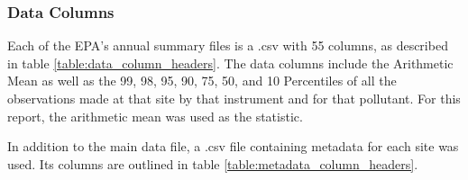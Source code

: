 \subsubsection*{Data Columns}
\label{subsubsec:datacolumns}
Each of the \ac{EPA}'s annual summary files is a .csv with 55 columns, as described in table \ref{table:data_column_headers}.  The data columns include the Arithmetic Mean as well as the 99, 98, 95, 90, 75, 50, and 10 Percentiles of all the observations made at that site by that instrument and for that pollutant.  For this report, the arithmetic mean 
was used as the statistic.  

In addition to the main data file, a .csv file containing metadata for each site was used. Its columns are outlined in table \ref{table:metadata_column_headers}.

